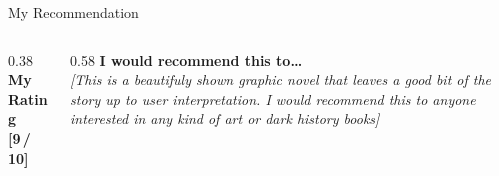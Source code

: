 \documentclass[aspectratio=169]{beamer}
\begin{document}
\begin{frame}{My Recommendation}
  \begin{columns}[T]
    \begin{column}{0.38\textwidth}
      \vspace{1em}
      {\large\textbf{My Rating}} \\[0.8em]
      {\Huge\textbf{[9\,/\,10]}}
    \end{column}
    \begin{column}{0.58\textwidth}
      \vspace{1em}
      \textbf{I would recommend this to\ldots} \\[0.6em]
      \textit{[This is a beautifuly shown graphic novel that leaves a good bit of the story up to user interpretation. I would recommend this to anyone interested in any kind of art or dark history books]}
    \end{column}
  \end{columns}
\end{frame}
\end{document}

